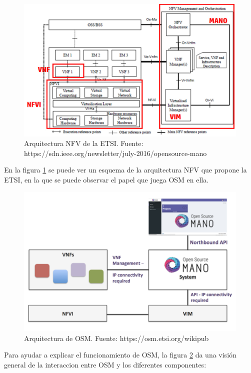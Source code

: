 \begin{figure}[!ht]
	\centering
	\includegraphics[width=0.8\linewidth]{imagenes/nfv_etsi_Arch}
	\caption{Arquitectura NFV de la ETSI. 
		Fuente: https://sdn.ieee.org/newsletter/july-2016/opensource-mano}
	\label{fig:nfvetsiarch}
\end{figure}

En la figura \ref{fig:nfvetsiarch} se puede ver un esquema de la arquitectura NFV que propone la ETSI, en la que se puede observar el papel que juega OSM en ella. 

\begin{figure}[!ht]
	\centering
	\includegraphics[width=0.8\linewidth]{imagenes/osm_arch}
	\caption{Arquitectura de OSM. 
		Fuente: https://osm.etsi.org/wikipub}
	\label{fig:osmarch}
\end{figure}

Para ayudar a explicar el funcionamiento de OSM, la figura \ref{fig:osmarch} da una visión general de la interaccion entre OSM y los diferentes componentes:

